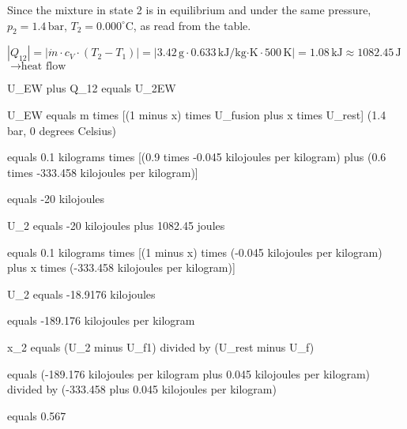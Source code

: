 Since the mixture in state 2 is in equilibrium and under the same pressure, \( p_2 = 1.4 \, \text{bar} \), \( T_2 = 0.000^\circ \text{C} \), as read from the table.  

\( |Q_{12}| = |\dot{m} \cdot c_V \cdot (T_2 - T_1)| = |3.42 \, \text{g} \cdot 0.633 \, \text{kJ/kg·K} \cdot 500 \, \text{K}| = 1.08 \, \text{kJ} \approx 1082.45 \, \text{J} \)  
\( \rightarrow \text{heat flow} \)

U_EW plus Q_12 equals U_2EW  

U_EW equals m times [(1 minus x) times U_fusion plus x times U_rest] (1.4 bar, 0 degrees Celsius)  

equals 0.1 kilograms times [(0.9 times -0.045 kilojoules per kilogram) plus (0.6 times -333.458 kilojoules per kilogram)]  

equals -20 kilojoules  

U_2 equals -20 kilojoules plus 1082.45 joules  

equals 0.1 kilograms times [(1 minus x) times (-0.045 kilojoules per kilogram) plus x times (-333.458 kilojoules per kilogram)]  

U_2 equals -18.9176 kilojoules  

equals -189.176 kilojoules per kilogram  

x_2 equals (U_2 minus U_f1) divided by (U_rest minus U_f)  

equals (-189.176 kilojoules per kilogram plus 0.045 kilojoules per kilogram) divided by (-333.458 plus 0.045 kilojoules per kilogram)  

equals 0.567